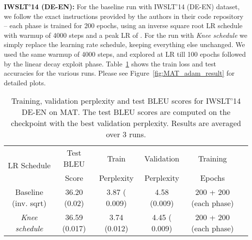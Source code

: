 \documentclass{article} \usepackage{iclr2021_conference,times}
\newcommand{\lrschedule}{\textit{Knee schedule}}
\begin{document}
\textbf{IWSLT'14 (DE-EN):} For the baseline run with IWSLT'14 (DE-EN) dataset, we follow the exact instructions provided by the authors in their code repository -- each phase is trained for 200 epochs, using an inverse square root LR schedule with warmup of 4000 steps and a peak LR of . For the run with \lrschedule{} we simply replace the learning rate schedule, keeping everything else unchanged. We used the same warmup of 4000 steps, and explored at  LR till 100 epochs followed by the linear decay exploit phase. Table~\ref{tab:iwslt_mat_results_train_loss_test_acc} shows the train loss and test accuracies for the various runs. Please see Figure~\ref{fig:MAT_adam_result} for detailed plots.

\begin{table}[h]
\small
\centering
\caption{Training, validation perplexity and test BLEU scores for IWSLT'14 DE-EN on MAT. The test BLEU scores are computed on the checkpoint with the best validation perplexity. Results are averaged over 3 runs.}
\label{tab:iwslt_mat_results_train_loss_test_acc}
{\setlength{\extrarowheight}{1pt}\begin{tabular}{cccccc}
\toprule
  \multirow{2}{*}{LR Schedule} & Test BLEU  & Train & Validation  & Training \\
  &  Score & Perplexity  & Perplexity & Epochs \\ 
 \midrule
  Baseline (inv. sqrt)  &  36.20 (0.02)   & 3.87 ( 0.009)  & 4.58 (0.009)  & 200 + 200 (each phase) \\
  \lrschedule{}  & 36.59 (0.017)  & 3.74 (0.012)  & 4.45 ( 0.009)  & 200 + 200 (each phase) \\ 
\bottomrule 
\end{tabular}}

\end{table}
\end{document}
